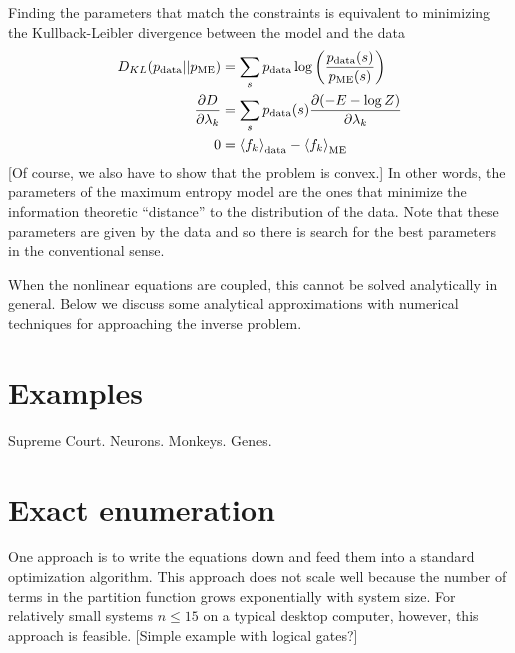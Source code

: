 \documentclass[aps,prl,twocolumn]{revtex4-1}
\begin{document}
Finding the parameters that match the constraints is equivalent to minimizing the Kullback-Leibler divergence between the model and the data \cite{Cover:2006tl}
\begin{align}
	D_{KL}(p_{\rm data}||p_{\rm ME}) &= \sum_s p_{\rm data} \log\left(\frac{p_{\rm data}(s)}{p_{\rm ME}(s)}\right)\\
	\frac{\partial D}{\partial \lambda_k} &= \sum_s p_{\rm data}(s) \frac{\partial (-E-\log Z)}{\partial \lambda_k}\\
	0 &= \left<f_k\right>_{\rm data} -\left<f_k\right>_{\rm ME}
\end{align}
[Of course, we also have to show that the problem is convex.] In other words, the parameters of the maximum entropy model are the ones that minimize the information theoretic ``distance'' to the distribution of the data. Note that these parameters are given by the data and so there is search for the best parameters in the conventional sense.

When the nonlinear equations are coupled, this cannot be solved analytically in general. Below we discuss some analytical approximations with numerical techniques for approaching the inverse problem.


\section{Examples}
Supreme Court. Neurons. Monkeys. Genes.

\section{Exact enumeration}
One approach is to write the equations down and feed them into a standard optimization algorithm. This approach does not scale well because the number of terms in the partition function grows exponentially with system size. For relatively small systems $n\leq15$ on a typical desktop computer, however, this approach is feasible. [Simple example with logical gates?]
\end{document}
